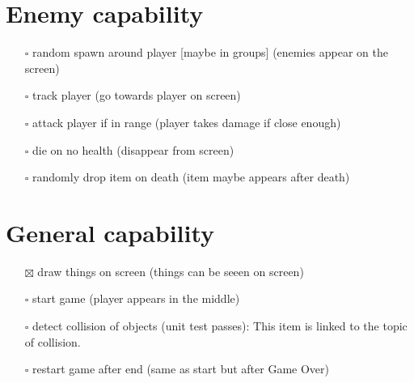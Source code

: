 \documentclass[
]{article}
\providecommand{\tightlist}{%
  \setlength{\itemsep}{0pt}\setlength{\parskip}{0pt}}
\begin{document}
\section{Enemy capability}\label{enemy-capability}

\begin{itemize}
\tightlist
\item[$\square$]
  random spawn around player {[}maybe in groups{]} (enemies appear on
  the screen)
\item[$\square$]
  track player (go towards player on screen)
\item[$\square$]
  attack player if in range (player takes damage if close enough)
\item[$\square$]
  die on no health (disappear from screen)
\item[$\square$]
  randomly drop item on death (item maybe appears after death)
\end{itemize}

\section{General capability}\label{general-capability}

\begin{itemize}
\tightlist
\item[$\boxtimes$]
  draw things on screen (things can be seeen on screen)
\item[$\square$]
  start game (player appears in the middle)
\item[$\square$]
  detect collision of objects (unit test passes): This item is linked to the topic of collision. 
\item[$\square$]
  restart game after end (same as start but after Game Over)
\end{itemize}
\end{document}
